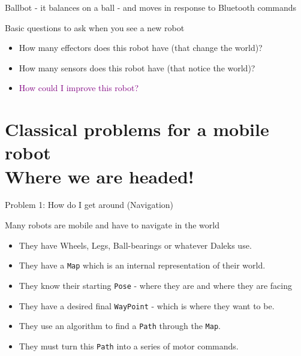 \documentclass[color=pdftex,usenames,dvipsnames, aspectratio=169]{beamer}
\begin{document}
\begin{frame}[fragile]{Ballbot - it balances on a ball - and moves in response to Bluetooth commands}
\begin{center}
\href{https://youtu.be/PX7RNmyJgEs}{}
\end{center}

\begin{block}{Basic questions to ask when you see a new robot}
\begin{itemize}
\item \textcolor{OliveGreen}{How many effectors} does this robot have (that change the world)?
\item \textcolor{RedOrange}{How many sensors} does this robot have (that notice the world)?
\item \textcolor{purple}{How could I improve this robot?}
\end{itemize}
\end{block}
\end{frame}

\section{Classical problems for a mobile robot\\Where we are headed!}

\begin{frame}{Problem 1: How do I get around (Navigation)}
\begin{block}{Many robots are mobile and have to navigate in the world}
\begin{itemize}
  \item They have Wheels, Legs, Ball-bearings or whatever Daleks use.
  \item They have a \lstinline!Map! which is an internal representation of their world.
  \item They know their starting \lstinline!Pose! - where they are and where they are facing
  \item They have a desired final \lstinline!WayPoint! - which is where they want to be.
  \item They use an algorithm to find a \lstinline!Path! through the \lstinline!Map!.
  \item They must turn this \lstinline!Path! into a series of motor commands.
\end{itemize}
\end{block}
\end{frame}
\end{document}
